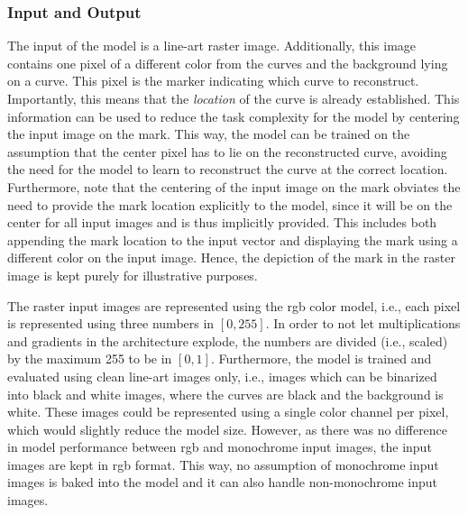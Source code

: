 \subsubsection{Input and Output}
\label{subsec:io}

The input of the model is a line-art raster image. Additionally, this image contains one pixel of a different color from the curves and the background lying on a curve. This pixel is the marker indicating which curve to reconstruct. Importantly, this means that the \textit{location} of the curve is already established. This information can be used to reduce the task complexity for the model by centering the input image on the mark. This way, the model can be trained on the assumption that the center pixel has to lie on the reconstructed curve, avoiding the need for the model to learn to reconstruct the curve at the correct location. Furthermore, note that the centering of the input image on the mark obviates the need to provide the mark location explicitly to the model, since it will be on the center for all input images and is thus implicitly provided. This includes both appending the mark location to the input vector and displaying the mark using a different color on the input image. Hence, the depiction of the mark in the raster image is kept purely for illustrative purposes.

The raster input images are represented using the \gls{rgb} color model, i.e., each pixel is represented using three numbers in $[0,255]$. In order to not let multiplications and gradients in the architecture explode, the numbers are divided (i.e., scaled) by the maximum 255 to be in $[0,1]$. Furthermore, the model is trained and evaluated using clean line-art images only, i.e., images which can be binarized into black and white images, where the curves are black and the background is white. These images could be represented using a single color channel per pixel, which would slightly reduce the model size. However, as there was no difference in model performance between \gls{rgb} and monochrome input images, the input images are kept in \gls{rgb} format. This way, no assumption of monochrome input images is baked into the model and it can also handle non-monochrome input images.

